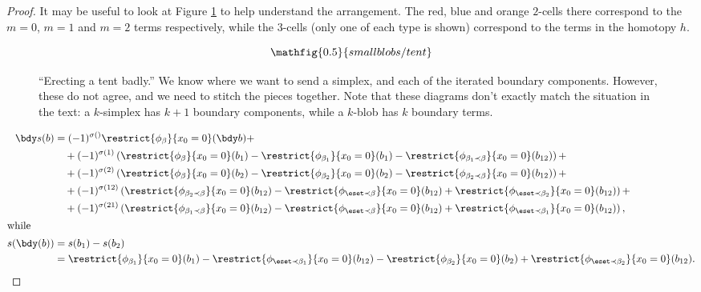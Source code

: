 \begin{proof}
It may be useful to look at Figure \ref{fig:erectly-a-tent-badly} to help understand the arrangement. The red, blue and orange $2$-cells there correspond to the $m=0$, $m=1$ and $m=2$ terms respectively, while the $3$-cells (only one of each type is shown) correspond to the terms in the homotopy $h$.
\begin{figure}[!ht]
$$\mathfig{0.5}{smallblobs/tent}$$
\caption{``Erecting a tent badly.'' We know where we want to send a simplex, and each of the iterated boundary components. However, these do not agree, and we need to stitch the pieces together. Note that these diagrams don't exactly match the situation in the text: a $k$-simplex has $k+1$ boundary components, while a $k$-blob has $k$ boundary terms.}
\label{fig:erectly-a-tent-badly}
\end{figure}

\begin{align*}
\bdy s(b) & =  (-1)^{\sigma()} \restrict{\phi_{\beta}}{x_0 = 0}(\bdy b) + \\
	& \quad + (-1)^{\sigma(1)} \left( \restrict{\phi_{\beta}}{x_0 = 0}(b_1) - \restrict{\phi_{\beta_1}}{x_0 = 0}(b_1) - \restrict{\phi_{\beta_1 \prec \beta}}{x_0 = 0}(b_{12}) \right) + \\
	& \quad + (-1)^{\sigma(2)} \left( \restrict{\phi_{\beta}}{x_0 = 0}(b_2) - \restrict{\phi_{\beta_2}}{x_0 = 0}(b_2) - \restrict{\phi_{\beta_2 \prec \beta}}{x_0 = 0}(b_{12}) \right) + \\
	& \quad + (-1)^{\sigma(12)} \left( \restrict{\phi_{\beta_2 \prec \beta}}{x_0 = 0}(b_{12}) - \restrict{\phi_{\eset \prec \beta}}{x_0 = 0}(b_{12}) + \restrict{\phi_{\eset \prec \beta_2}}{x_0 = 0}(b_{12}) \right) + \\ 
	& \quad + (-1)^{\sigma(21)} \left( \restrict{\phi_{\beta_1 \prec \beta}}{x_0 = 0}(b_{12}) - \restrict{\phi_{\eset  \prec \beta}}{x_0 = 0}(b_{12}) + \restrict{\phi_{\eset \prec \beta_1}}{x_0 = 0}(b_{12}) \right), \\
\intertext{while}
s(\bdy(b)) & = s(b_1) - s(b_2) \\
		& = \restrict{\phi_{\beta_1}}{x_0=0}(b_1) - \restrict{\phi_{\eset \prec \beta_1}}{x_0=0}(b_{12}) - \restrict{\phi_{\beta_2}}{x_0=0}(b_2) + \restrict{\phi_{\eset \prec \beta_2}}{x_0=0}(b_{12}) .
\end{align*}


\end{proof}
